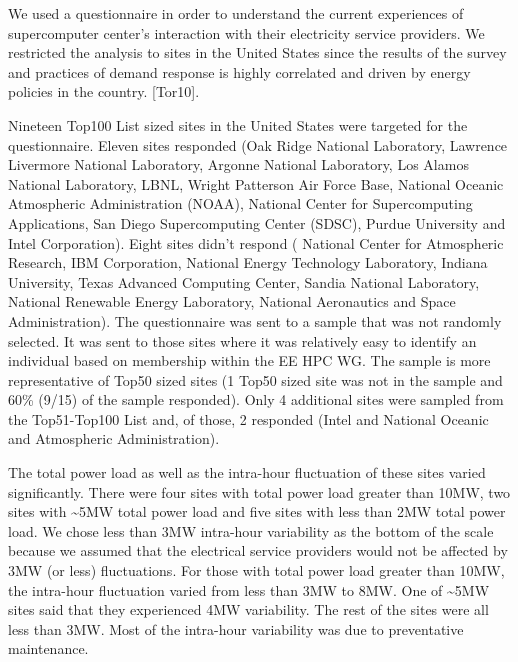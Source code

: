 We used a questionnaire in order to understand the current experiences of
supercomputer center's interaction with their electricity
service providers. We restricted the analysis to sites in the United States
since the results of the survey and practices of demand response is highly
correlated and driven by energy policies in the country. 
\cite{torriti_demand_2010}
[Tor10].

Nineteen Top100 List sized sites in the United States were targeted for the
questionnaire. Eleven sites responded (Oak Ridge National Laboratory, 
Lawrence Livermore National Laboratory, 
Argonne National Laboratory, 
Los Alamos National Laboratory, LBNL, 
Wright Patterson Air Force Base,
National Oceanic Atmospheric Administration (NOAA), 
National Center for Supercomputing Applications, 
San Diego Supercomputing Center (SDSC), 
Purdue University and Intel Corporation). Eight sites didn't respond (
National Center for Atmospheric Research,
IBM Corporation, 
National Energy Technology Laboratory, Indiana University, 
Texas Advanced Computing Center, 
Sandia National Laboratory, 
National Renewable Energy Laboratory, 
National Aeronautics and Space Administration). The questionnaire was
sent to a sample that was not randomly selected. It was sent to those sites
where it was relatively easy to identify an individual based on membership
within the EE HPC WG. The sample is more representative of Top50 sized sites
(1 Top50 sized site was not in the sample and 60{\%} (9/15) of the sample
responded). Only 4 additional sites were sampled from the Top51-Top100 List
and, of those, 2 responded (Intel and National Oceanic and Atmospheric Administration).

The total power load as well as the intra-hour fluctuation of these sites
varied significantly. There were four sites with total power load greater
than 10MW, two sites with \textasciitilde 5MW total power load and five
sites with less than 2MW total power load. We chose less than 3MW intra-hour
variability as the bottom of the scale because we assumed that the
electrical service providers would not be affected by 3MW (or less) 
fluctuations. For those with total power load greater than 10MW, the
intra-hour fluctuation varied from less than 3MW to 8MW. One of
\textasciitilde 5MW sites said that they experienced 4MW variability. The
rest of the sites were all less than 3MW. Most of the intra-hour variability
was due to preventative maintenance.



